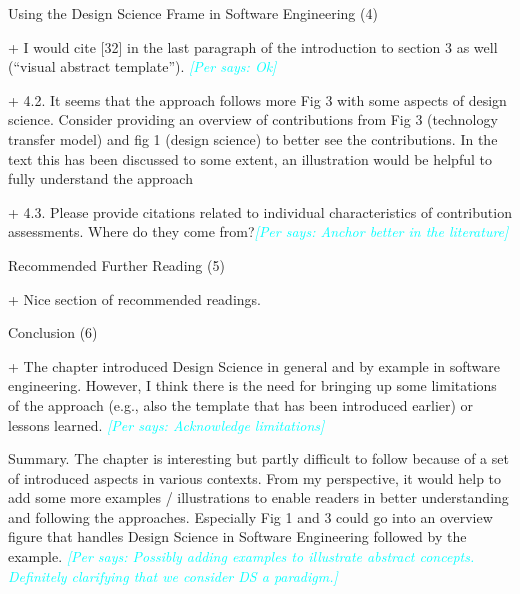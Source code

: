 \documentclass{article}
\newcommand{\per}[1]{\textcolor{cyan}{{\it [Per says: #1]}}}
\newcommand{\per}[1]{}
\begin{document}
Using the Design Science Frame in Software Engineering (4)

+ I would cite [32] in the last paragraph of the introduction to section 3 as well (“visual abstract template”). \per{Ok}

+ 4.2. It seems that the approach follows more Fig 3 with some aspects of design science. Consider providing an overview of contributions from Fig 3 (technology transfer model) and fig 1 (design science) to better see the contributions. In the text this has been discussed to some extent, an illustration would be helpful to fully understand the approach

+ 4.3. Please provide citations related to individual characteristics of contribution assessments. Where do they come from?\per{Anchor better in the literature}

Recommended Further Reading (5)

+ Nice section of recommended readings.

Conclusion (6)

+ The chapter introduced Design Science in general and by example in software engineering. However, I think there is the need for bringing up some limitations of the approach (e.g., also the template that has been introduced earlier) or lessons learned. \per{Acknowledge limitations}

Summary. The chapter is interesting but partly difficult to follow because of a set of introduced aspects in various contexts. From my perspective, it would help to add some more examples / illustrations to enable readers in better understanding and following the approaches. Especially Fig 1 and 3 could go into an overview figure that handles Design Science in Software Engineering followed by the example. \per{Possibly adding examples to illustrate abstract concepts. Definitely clarifying that we consider DS a paradigm.}
\end{document}
